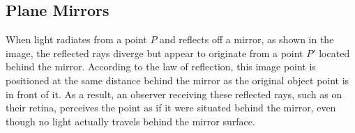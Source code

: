 \documentclass[
  a4paper,
]{book}
\begin{document}
\subsection{Plane Mirrors}\label{plane-mirrors}

When light radiates from a point \(P\) and reflects off a mirror, as
shown in the image, the reflected rays diverge but appear to originate
from a point \(P'\) located behind the mirror. According to the law of
reflection, this image point is positioned at the same distance behind
the mirror as the original object point is in front of it. As a result,
an observer receiving these reflected rays, such as on their retina,
perceives the point as if it were situated behind the mirror, even
though no light actually travels behind the mirror surface.

\begin{figure}

\begin{minipage}{0.44\linewidth}


\subcaption{\label{fig-plane-mirror}}

\end{minipage}%
%
\begin{minipage}{0.56\linewidth}

\end{minipage}
\end{figure}
\end{document}
